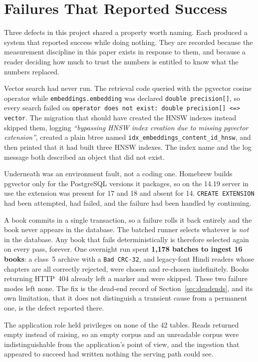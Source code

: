 \section{Failures That Reported Success}
\label{sec:failures}

Three defects in this project shared a property worth naming. Each produced a system that reported success while doing nothing. They are recorded because the measurement discipline in this paper exists in response to them, and because a reader deciding how much to trust the numbers is entitled to know what the numbers replaced.

Vector search had never run. The retrieval code queried with the pgvector cosine operator while \texttt{embeddings.embedding} was declared \texttt{double precision[]}, so every search failed on \texttt{operator does not exist: double precision[] <=> vector}. The migration that should have created the HNSW indexes instead skipped them, logging \emph{``bypassing HNSW index creation due to missing pgvector extension''}, created a plain btree named \texttt{idx\_embeddings\_content\_id\_hnsw}, and then printed that it had built three HNSW indexes. The index name and the log message both described an object that did not exist.

Underneath was an environment fault, not a coding one. Homebrew builds pgvector only for the PostgreSQL versions it packages, so on the 14.19 server in use the extension was present for 17 and 18 and absent for 14. \texttt{CREATE EXTENSION} had been attempted, had failed, and the failure had been handled by continuing.

A book commits in a single transaction, so a failure rolls it back entirely and the book never appears in the database. The batched runner selects whatever is \emph{not} in the database. Any book that fails deterministically is therefore selected again on every pass, forever. One overnight run spent \textbf{1,178 batches to ingest 16 books}: a class~5 archive with a \texttt{Bad CRC-32}, and legacy-font Hindi readers whose chapters are all correctly rejected, were chosen and re-chosen indefinitely. Books returning HTTP~404 already left a marker and were skipped. These two failure modes left none. The fix is the dead-end record of Section~\ref{sec:deadends}, and its own limitation, that it does not distinguish a transient cause from a permanent one, is the defect reported there.

The application role held privileges on none of the 42 tables. Reads returned empty instead of raising, so an empty corpus and an unreadable corpus were indistinguishable from the application's point of view, and the ingestion that appeared to succeed had written nothing the serving path could see.

